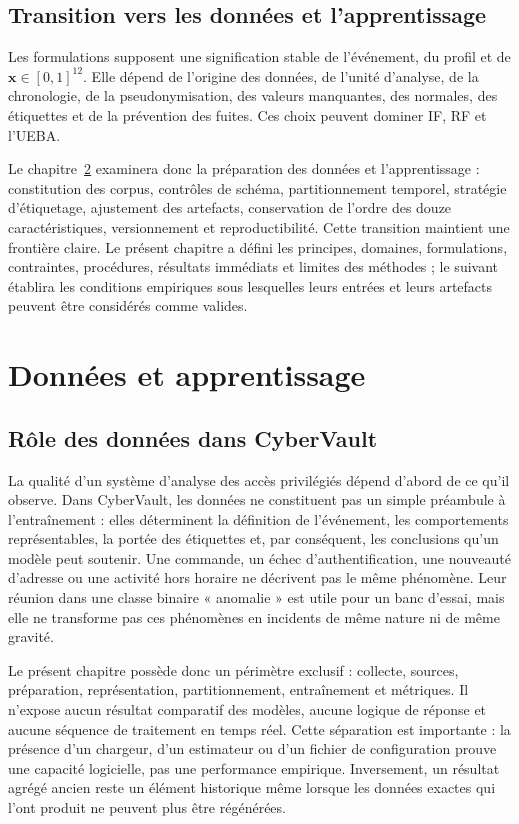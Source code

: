 \documentclass[11pt,a4paper,oneside]{report}
\theoremstyle{definition}
\theoremstyle{plain}
\begin{document}
\section{Transition vers les données et l'apprentissage}
\label{sec:ai-ro-transition-data}

Les formulations supposent une signification stable de l'événement, du profil et de
$\mathbf{x}\in[0,1]^{12}$. Elle dépend de l'origine des données, de l'unité d'analyse, de la chronologie, de la pseudonymisation, des valeurs manquantes, des normales, des étiquettes et de la prévention des fuites. Ces choix peuvent dominer IF, RF et l'UEBA.

Le chapitre~\ref{chap:data} examinera donc la préparation des données et l'apprentissage : constitution des corpus, contrôles de schéma, partitionnement temporel, stratégie d'étiquetage, ajustement des artefacts, conservation de l'ordre des douze caractéristiques, versionnement et reproductibilité. Cette transition maintient une frontière claire. Le présent chapitre a défini les principes, domaines, formulations, contraintes, procédures, résultats immédiats et limites des méthodes ; le suivant établira les conditions empiriques sous lesquelles leurs entrées et leurs artefacts peuvent être considérés comme valides.

\chapter{Données et apprentissage}
\label{chap:data}

\section{Rôle des données dans CyberVault}

La qualité d'un système d'analyse des accès privilégiés dépend d'abord de ce
qu'il observe. Dans CyberVault, les données ne constituent pas un simple
préambule à l'entraînement : elles déterminent la définition de l'événement,
les comportements représentables, la portée des étiquettes et, par conséquent,
les conclusions qu'un modèle peut soutenir. Une commande, un échec
d'authentification, une nouveauté d'adresse ou une activité hors horaire ne
décrivent pas le même phénomène. Leur réunion dans une classe binaire
« anomalie » est utile pour un banc d'essai, mais elle ne transforme pas ces
phénomènes en incidents de même nature ni de même gravité.

Le présent chapitre possède donc un périmètre exclusif : collecte, sources,
préparation, représentation, partitionnement, entraînement et métriques. Il
n'expose aucun résultat comparatif des modèles, aucune logique de réponse et
aucune séquence de traitement en temps réel. Cette séparation est importante :
la présence d'un chargeur, d'un estimateur ou d'un fichier de configuration
prouve une capacité logicielle, pas une performance empirique. Inversement, un
résultat agrégé ancien reste un élément historique même lorsque les données
exactes qui l'ont produit ne peuvent plus être régénérées.
\end{document}
